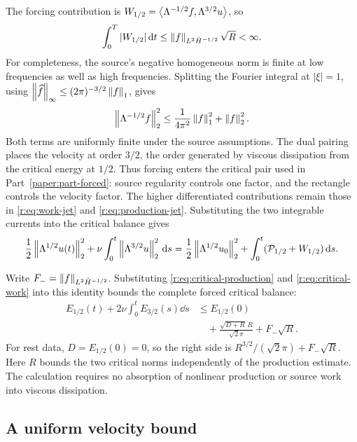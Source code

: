 The forcing contribution is
\(W_{1/2}=\left\langle \Lambda^{-1/2}f,\Lambda^{3/2}u\right\rangle\), so
\begin{equation}
 \int_0^T|W_{1/2}|\,\mathrm d t
 \le\left\lVert f\right\rVert_{L^2\dot H^{-1/2}}\sqrt R<\infty.
 \label{r:eq:critical-work}
\end{equation}
For completeness, the source's negative homogeneous norm is finite at low
frequencies as well as high frequencies. Splitting the Fourier integral at
\(|\xi|=1\), using \(\left\lVert \widehat f\right\rVert_\infty\le
(2\pi)^{-3/2}\left\lVert f\right\rVert_1\), gives
\[
 \left\lVert \Lambda^{-1/2}f\right\rVert_2^2
 \le\frac1{4\pi^2}\left\lVert f\right\rVert_1^2+\left\lVert f\right\rVert_2^2.
\]
Both terms are uniformly finite under the source assumptions.
The dual pairing places the velocity at order \(3/2\), the order
generated by viscous dissipation from the critical energy at \(1/2\).
Thus forcing enters the critical pair used in Part~\ref{paper:part-forced}:
source regularity controls one factor, and the rectangle controls
the velocity factor. The higher differentiated contributions remain
those in \eqref{r:eq:work-jet} and \eqref{r:eq:production-jet}.
Substituting the two integrable currents into the critical balance gives
\[
 \frac12\left\lVert \Lambda^{1/2}u(t)\right\rVert_2^2
 +\nu\int_0^t\left\lVert \Lambda^{3/2}u\right\rVert_2^2\,\mathrm d s
 =\frac12\left\lVert \Lambda^{1/2}u_0\right\rVert_2^2
 +\int_0^t(\mathcal P_{1/2}+W_{1/2})\,\mathrm d s.
\]

Write \(F_-=\left\lVert f\right\rVert_{L^2\dot H^{-1/2}}\). Substituting
\eqref{r:eq:critical-production} and \eqref{r:eq:critical-work} into this
identity bounds the complete forced critical balance:
\begin{equation}
 \begin{aligned}
 E_{1/2}(t)+2\nu\int_0^t E_{3/2}(s)\dd s
 &\le E_{1/2}(0)\\
 &\quad+\frac{\sqrt{D+R}\,R}{\sqrt2\pi}
       +F_-\sqrt R.
 \end{aligned}
 \label{r:eq:forced-critical-bound}
\end{equation}
For rest data, \(D=E_{1/2}(0)=0\), so the right side is
\(R^{3/2}/(\sqrt2\pi)+F_-\sqrt R\).
Here \(R\) bounds the two critical norms independently of the
production estimate. The calculation requires no absorption of
nonlinear production or source work into viscous dissipation.

\subsection{A uniform velocity bound}\label{r:sec:velocity}

